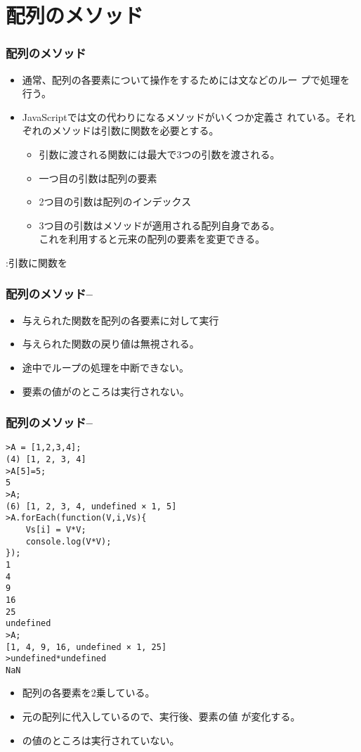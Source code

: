 

\frame{\maketitle}
\section{配列のメソッド}
\begin{frame}[containsverbatim]
 \frametitle{配列のメソッド}
\begin{itemize}
 \item 通常、配列の各要素について操作をするためには文などのルー
 プで処理を行う。
 \item JavaScriptでは文の代わりになるメソッドがいくつか定義さ
       れている。それぞれのメソッドは引数に関数を必要とする。
       \begin{itemize}
        \item 引数に渡される関数には最大で3つの引数を渡される。
        \item 一つ目の引数は配列の要素
        \item 2つ目の引数は配列のインデックス
        \item 3つ目の引数はメソッドが適用される配列自身である。\\
              これを利用すると元来の配列の要素を変更できる。
       \end{itemize}
\end{itemize}
 :引数に関数を
\end{frame}
\begin{frame}[containsverbatim]
 \frametitle{配列のメソッド--}
 \begin{itemize}
  \item 与えられた関数を配列の各要素に対して実行
  \item 与えられた関数の戻り値は無視される。
  \item 途中でループの処理を中断できない。
  \item 要素の値がのところは実行されない。
 \end{itemize}
\end{frame}
\begin{frame}[containsverbatim]
 \frametitle{配列のメソッド--}

\begin{Verbatim}[fontsize=\tiny]
 >A = [1,2,3,4];
(4) [1, 2, 3, 4]
>A[5]=5;
5
>A;
(6) [1, 2, 3, 4, undefined × 1, 5]
>A.forEach(function(V,i,Vs){
    Vs[i] = V*V;
    console.log(V*V);
});
1
4
9
16
25
undefined
>A;
[1, 4, 9, 16, undefined × 1, 25]
>undefined*undefined
NaN
\end{Verbatim}
 \begin{itemize}
  \item 配列の各要素を2乗している。
  \item 元の配列に代入しているので、実行後、要素の値
 が変化する。
  \item {}の値のところは実行されていない。
 \end{itemize}
\end{frame}
